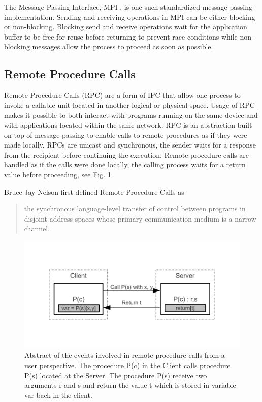 The Message Passing Interface, MPI \cite{mpi3stand}, is one such standardized message passing implementation. Sending and receiving operations in MPI can be either blocking or non-blocking. Blocking send and receive operations wait for the application buffer to be free for reuse before returning to prevent race conditions while non-blocking messages allow the process to proceed as soon as possible.

\subsection{Remote Procedure Calls}
Remote Procedure Calls (RPC) are a form of IPC that allow one process to invoke a callable unit \cite{Eac} located in another logical or physical space. Usage of RPC makes it possible to both interact with programs running on the same device and with applications located within the same network. RPC is an abstraction built on top of message passing to enable calls to remote procedures as if they were made locally.
RPCs are unicast and synchronous, the sender waits for a response from the recipient before continuing the execution. Remote procedure calls are handled as if the calls were done locally, the calling process waits for a return value before proceeding, see Fig. \ref{rpc}.

Bruce Jay Nelson first defined Remote Procedure Calls as
\begin{quotation}
\centering
[...] the synchronous language-level transfer of control between programs in disjoint address spaces whose primary communication medium is a narrow channel.  \cite{Nelson:1981:RPC:910306}
\end{quotation}

\begin{figure}[ht]
		\centering	
		\includegraphics{part_2/remote_procedure_calls/rpc.pdf}
		\caption{Abstract of the events involved in remote procedure calls from a user perspective.
The procedure P(c) in the Client calls procedure P(s) located at the Server. The procedure P(s) receive two arguments r and s and return the value t which is stored in variable var back in the client.}
		\label{rpc}
\end{figure}

